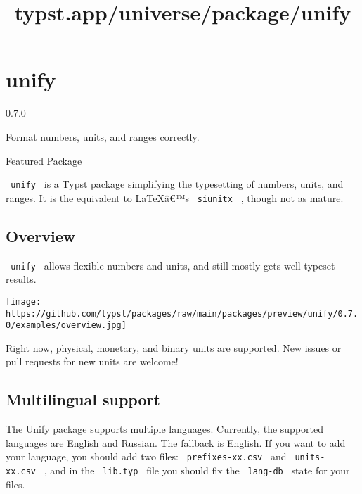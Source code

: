 \title{typst.app/universe/package/unify}

\label{banner}
\section{unify}\label{unify}

{ 0.7.0 }

Format numbers, units, and ranges correctly.

{ } Featured Package

\label{readme}
\texttt{\ unify\ } is a \href{https://github.com/typst/typst}{Typst}
package simplifying the typesetting of numbers, units, and ranges. It is
the equivalent to LaTeXâ€™s \texttt{\ siunitx\ } , though not as mature.

\subsection{Overview}\label{overview}

\texttt{\ unify\ } allows flexible numbers and units, and still mostly
gets well typeset results.

\begin{Shaded}
\begin{Highlighting}[]

\end{Highlighting}
\end{Shaded}

\texttt{[image: https://github.com/typst/packages/raw/main/packages/preview/unify/0.7.0/examples/overview.jpg]}

Right now, physical, monetary, and binary units are supported. New
issues or pull requests for new units are welcome!

\subsection{Multilingual support}\label{multilingual-support}

The Unify package supports multiple languages. Currently, the supported
languages are English and Russian. The fallback is English. If you want
to add your language, you should add two files:
\texttt{\ prefixes-xx.csv\ } and \texttt{\ units-xx.csv\ } , and in the
\texttt{\ lib.typ\ } file you should fix the \texttt{\ lang-db\ } state
for your files.

